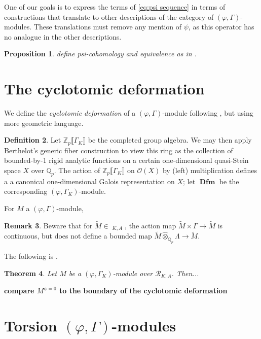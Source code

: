 \documentclass[12pt]{amsart}
\newtheorem{theorem}{Theorem}[section]
\newtheorem{prop}[theorem]{Proposition}
\theoremstyle{definition}
\newtheorem{defn}[theorem]{Definition}
\newtheorem{remark}[theorem]{Remark}
\numberwithin{equation}{theorem}
\newcommand{\QQ}{\mathbb{Q}}
\newcommand{\ZZ}{\mathbb{Z}}
\newcommand{\calO}{\mathcal{O}}
\newcommand{\calR}{\mathcal{R}}
\DeclareMathOperator{\Dfm}{\mathbf{Dfm}}
\DeclareMathOperator{\PhiGammatilde}{\widetilde{\mathbf{\Phi \Gamma}}}
\begin{document}
One of our goals is to express the terms of \eqref{eq:psi sequence} in terms of constructions that translate to other descriptions of the category of $(\varphi, \Gamma)$-modules. These translations must remove any mention of $\psi$, as this operator has no analogue in the other descriptions.

\begin{prop}
define psi-cohomology and equivalence as in \cite[Definition~2.3.3]{kpx}.
\end{prop}

\section{The cyclotomic deformation}

We define the \emph{cyclotomic deformation} of a $(\varphi, \Gamma)$-module following 
\cite[Definition~4.4.7]{kpx}, but using more geometric language.
\begin{defn}
Let $\ZZ_p \llbracket \Gamma_K \rrbracket$ be the completed group algebra. We may then apply Berthelot's generic fiber construction to view this ring as the collection of bounded-by-1 rigid analytic functions on a certain one-dimensional quasi-Stein space $X$ over $\QQ_p$.
The action of $\ZZ_p \llbracket \Gamma_K \rrbracket$ on $\calO(X)$ by (left) multiplication
defines a a canonical one-dimensional Galois representation on $X$; let $\Dfm$ be the corresponding $(\varphi, \Gamma_K)$-module.

For $M$ a $(\varphi, \Gamma)$-module, 
\end{defn}

\begin{remark}
Beware that for $\tilde{M} \in \PhiGammatilde_{K,A}$, the action map
$\tilde{M} \times \Gamma \to \tilde{M}$ is continuous, but does not define a bounded map
$\tilde{M} \widehat{\otimes}_{\QQ_p} \Lambda \to \tilde{M}$.
\end{remark}


The following is \cite[Theorem~4.4.8]{kpx}.
\begin{theorem}
Let $M$ be a $(\varphi, \Gamma_K)$-module over $\calR_{K,A}$. Then...
\end{theorem}


\textbf{compare $M^{\psi=0}$ to the boundary of the cyclotomic deformation}

\appendix

\section{Torsion $(\varphi, \Gamma)$-modules}
\end{document}

